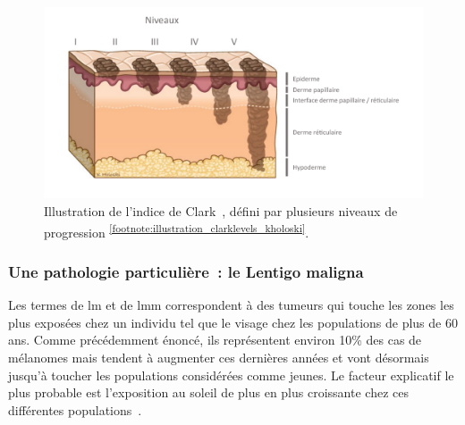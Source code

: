 \begin{figure}[H]
    \centering
    \includegraphics[width=0.9\linewidth]{contents/chapter_1/resources/illustration_clarklevels_kholoski.pdf}
    \caption{Illustration de l'indice de Clark~\cite{Clark1969}, défini par plusieurs niveaux de progression \textsuperscript{\ref{footnote:illustration_clarklevels_kholoski}}.}
    \label{fig:illustration_clarklevels_kholoski}
\end{figure}\par

\addtocounter{footnote}{1}

\subsubsection{Une pathologie particulière~: le Lentigo maligna}
\label{subsec:lentigo}
Les termes de \acrfull{lm} et de \acrfull{lmm} correspondent à des tumeurs qui touche les zones les plus exposées chez un individu tel que le visage chez les populations de plus de 60 ans. Comme précédemment énoncé, ils représentent environ 10\% des cas de mélanomes mais tendent à augmenter ces dernières années et vont désormais jusqu'à toucher les populations considérées comme jeunes. Le facteur explicatif le plus probable est l'exposition au soleil de plus en plus croissante chez ces différentes populations~\cite{Baccard2009, LeGal2011, LeDuff2014}.\par

